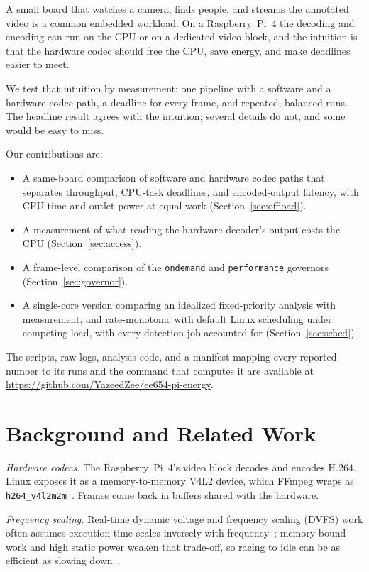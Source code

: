 \documentclass[conference]{IEEEtran}
\begin{document}
A small board that watches a camera, finds people, and streams the annotated video is a common embedded workload. On a Raspberry~Pi~4 the decoding and encoding can run on the CPU or on a dedicated video block, and the intuition is that the hardware codec should free the CPU, save energy, and make deadlines easier to meet.

We test that intuition by measurement: one pipeline with a software and a hardware codec path, a deadline for every frame, and repeated, balanced runs. The headline result agrees with the intuition; several details do not, and some would be easy to miss.

Our contributions are:
\begin{itemize}
\item A same-board comparison of software and hardware codec paths that separates throughput, CPU-task deadlines, and encoded-output latency, with CPU time and outlet power at equal work (Section~\ref{sec:offload}).
\item A measurement of what reading the hardware decoder's output costs the CPU (Section~\ref{sec:access}).
\item A frame-level comparison of the \texttt{ondemand} and \texttt{performance} governors (Section~\ref{sec:governor}).
\item A single-core version comparing an idealized fixed-priority analysis with measurement, and rate-monotonic with default Linux scheduling under competing load, with every detection job accounted for (Section~\ref{sec:sched}).
\end{itemize}
The scripts, raw logs, analysis code, and a manifest mapping every reported number to its runs and the command that computes it are available at \url{https://github.com/YazeedZee/ee654-pi-energy}.

\section{Background and Related Work}

\textit{Hardware codecs.} The Raspberry~Pi~4's video block decodes and encodes H.264. Linux exposes it as a memory-to-memory V4L2 device, which FFmpeg wraps as \texttt{h264\_v4l2m2m}~\cite{ffmpeg}. Frames come back in buffers shared with the hardware.

\textit{Frequency scaling.} Real-time dynamic voltage and frequency scaling (DVFS) work often assumes execution time scales inversely with frequency~\cite{pillai2001}; memory-bound work and high static power weaken that trade-off, so racing to idle can be as efficient as slowing down~\cite{miyoshi2002,lesueur2010}.
\end{document}
